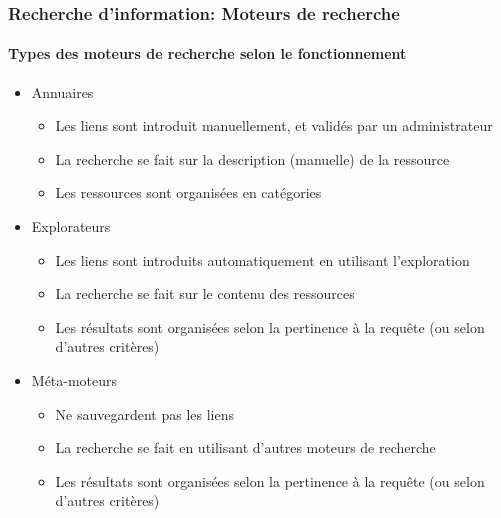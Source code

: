 \documentclass[xcolor=table]{beamer}
\begin{document}
\begin{frame}
\frametitle{Recherche d'information: Moteurs de recherche}
\framesubtitle{Types des moteurs de recherche selon le fonctionnement}


\begin{itemize}
	\item Annuaires
	\begin{itemize}
		\item Les liens sont introduit manuellement, et validés par un administrateur
		\item La recherche se fait sur la description (manuelle) de la ressource 
		\item Les ressources sont organisées en catégories 
	\end{itemize}
	
	\item Explorateurs
	\begin{itemize}
		\item Les liens sont introduits automatiquement en utilisant l'exploration 
		\item La recherche se fait sur le contenu des ressources
		\item Les résultats sont organisées selon la pertinence à la requête (ou selon d'autres critères)
	\end{itemize}

	\item Méta-moteurs
	\begin{itemize}
		\item Ne sauvegardent pas les liens 
		\item La recherche se fait en utilisant d'autres moteurs de recherche
		\item Les résultats sont organisées selon la pertinence à la requête (ou selon d'autres critères)
	\end{itemize}
\end{itemize} 

\end{frame}
\end{document}
